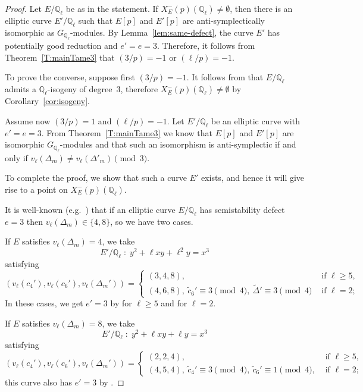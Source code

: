 \documentclass[12pt]{amsart}
\numberwithin{equation}{section}
\theoremstyle{definition}
\newcommand{\Q}{\mathbb{Q}}
\newcommand{\Xp}{X_E^{-}(p)}
\begin{document}
\begin{proof}
Let $E/\Q_\ell$ be as in the statement.
If $X_E^-(p)(\Q_\ell)\neq\emptyset$, then there is an elliptic curve
$E'/\Q_\ell$ such that $E[p]$ and $E'[p]$ are anti-symplectically
isomorphic as $G_{\Q_\ell}$-modules. By
Lemma~\ref{lem:same-defect}, the curve $E'$ has potentially good
reduction and $e'=e=3.$
Therefore, it follows from Theorem~\ref{T:mainTame3} that $(3/p)= -1$ or $(\ell/p)= -1$.

To prove the converse, suppose first $(3/p)=-1$.
It follows from \cite[Proposition 10]{symplectic} that $E/\Q_\ell$ admits a $\Q_\ell$-isogeny of degree~3, therefore $\Xp(\Q_\ell) \neq \emptyset$ by Corollary~\ref{cor:isogeny}.

Assume now $(3/p) = 1$ and $(\ell / p) = -1$. Let $E'/\Q_\ell$ be an elliptic curve with $e'=e=3$.
From Theorem~\ref{T:mainTame3} we know that
$E[p]$ and $E'[p]$ are isomorphic $G_{\Q_\ell}$-modules
and that such an isomorphism is anti-symplectic if and only if
$v_{\ell}(\Delta_m)\neq v_{\ell}(\Delta'_m) \pmod{3}$.

To complete the proof, we show that such a curve $E'$ exists, and hence it will give rise to a point on $\Xp(\Q_\ell)$.

It is well-known (e.g.~\cite[Table 5]{symplectic}) that if an elliptic curve $E/\Q_\ell$ has semistability defect $e=3$ then $v_\ell(\Delta_m)\in \{4,8\}$, so we have two cases.

If $E$ satisfies $v_\ell(\Delta_m)=4$, we take
\[
E'/\Q_{\ell} \; : \; y^2+\ell xy+ \ell^2 y = x^3
\]
satisfying
\[
(v_{\ell}(c_4'), v_{\ell}(c_6'), v_{\ell}(\Delta_m'))=
\begin{cases}
    (3,4,8), & \text{ if } \ell \geq 5,\\

(4,6,8),\: \tilde{c}_6' \equiv 3 \pmod 4, \: \tilde{\Delta}'\equiv 3 \pmod 4 & \text{ if } \ell=2;
\end{cases}
\]
In these cases, we get $e'=3$ by \cite[Proposition 1]{Kraus} for $\ell \geq 5$ and \cite[p. 358]{Kraus} for $\ell=2$.

If $E$ satisfies $v_\ell(\Delta_m)=8$, we take
\[
E'/\Q_{\ell} \; : \; y^2+\ell xy+ \ell y = x^3
\]
satisfying
\[
(v_{\ell}(c_4'), v_{\ell}(c_6'), v_{\ell}(\Delta_m'))=
\begin{cases}
    (2, 2, 4), & \text{ if } \ell \geq 5,\\
     (4,5,4),\: \tilde{c}_4' \equiv 3 \pmod 4, \: \tilde{c}_6' \equiv 1 \pmod 4,& \text{ if } \ell=2;
\end{cases}
\]
this curve also has $e'=3$
by \cite[Proposition 1 and p. 358]{Kraus}.
\end{proof}
\end{document}
